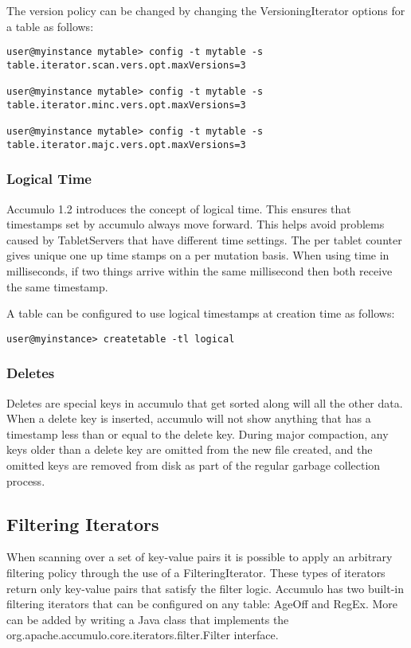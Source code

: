 The version policy can be changed by changing the VersioningIterator options for a
table as follows:

\small
\begin{verbatim}
user@myinstance mytable> config -t mytable -s
table.iterator.scan.vers.opt.maxVersions=3

user@myinstance mytable> config -t mytable -s
table.iterator.minc.vers.opt.maxVersions=3

user@myinstance mytable> config -t mytable -s
table.iterator.majc.vers.opt.maxVersions=3
\end{verbatim}
\normalsize

\subsubsection{Logical Time}

Accumulo 1.2 introduces the concept of logical time. This ensures that timestamps
set by accumulo always move forward. This helps avoid problems caused by
TabletServers that have different time settings. The per tablet counter gives unique
one up time stamps on a per mutation basis. When using time in milliseconds, if two
things arrive within the same millisecond then both receive the same timestamp.

A table can be configured to use logical timestamps at creation time as follows:

\small
\begin{verbatim}
user@myinstance> createtable -tl logical
\end{verbatim}
\normalsize

\subsubsection{Deletes}
Deletes are special keys in accumulo that get sorted along will all the other data.
When a delete key is inserted, accumulo will not show anything that has a
timestamp less than or equal to the delete key. During major compaction, any keys
older than a delete key are omitted from the new file created, and the omitted keys
are removed from disk as part of the regular garbage collection process.

\subsection{Filtering Iterators}
When scanning over a set of key-value pairs it is possible to apply an arbitrary
filtering policy through the use of a FilteringIterator. These types of iterators return
only key-value pairs that satisfy the filter logic. Accumulo has two built-in filtering
iterators that can be configured on any table: AgeOff and RegEx. More can be added
by writing a Java class that implements the\\
org.apache.accumulo.core.iterators.filter.Filter interface.

